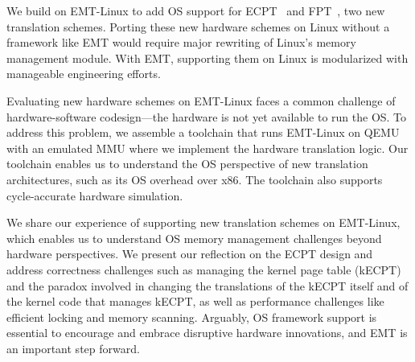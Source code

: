 

We build on EMT-Linux to add OS support for ECPT~\cite{skarlatos2020ecpt} and FPT~\cite{park2022fpt}, 
	two new translation schemes.
Porting these new hardware schemes on Linux without a framework like EMT would require 
	major rewriting of Linux's
	memory management module.
With EMT, supporting them on Linux is modularized 
	with manageable engineering efforts.

Evaluating new hardware schemes on EMT-Linux faces a common challenge 
	of hardware-software codesign---the hardware is not yet available
	to run the OS.
To address this problem, we assemble a toolchain that 
	runs EMT-Linux on QEMU with an emulated MMU where we implement
	the hardware translation logic.
Our toolchain enables us to understand the OS perspective of new translation
	architectures,
	such as its OS overhead over x86. %
The toolchain also supports cycle-accurate hardware simulation.

We share our experience of supporting new translation schemes
	on EMT-Linux, which
	enables us to understand OS memory management challenges 
	beyond hardware perspectives.
We present our reflection on the ECPT design and address correctness challenges such as managing
	the kernel page table (kECPT) and the paradox involved in 
	changing the translations of the kECPT itself and of the kernel code 
	that manages kECPT, as well as performance challenges like 
	efficient locking and memory scanning.
Arguably, OS framework support is essential to encourage and embrace 
	disruptive hardware innovations,
	and EMT is an important step forward.

